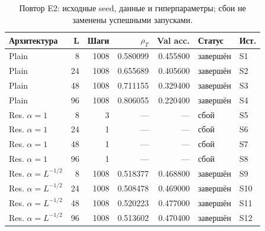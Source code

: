 \begin{table}[H]\centering\footnotesize
\setlength{\tabcolsep}{4pt}
\caption{Повтор E2: исходные seed, данные и гиперпараметры; сбои не заменены успешными запусками.}\label{tab:repeat_e2}
\begin{tabular}{lrrrrll}
\toprule
Архитектура & L & Шаги & $\rho_T$ & Val acc. & Статус & Ист. \\
\midrule
Plain & 8 & 1008 & 0.580099 & 0.455800 & завершён & S1 \\
Plain & 24 & 1008 & 0.655689 & 0.405600 & завершён & S2 \\
Plain & 48 & 1008 & 0.711155 & 0.329400 & завершён & S3 \\
Plain & 96 & 1008 & 0.806055 & 0.220400 & завершён & S4 \\
Res. $\alpha=1$ & 8 & 3 & --- & --- & сбой & S5 \\
Res. $\alpha=1$ & 24 & 1 & --- & --- & сбой & S6 \\
Res. $\alpha=1$ & 48 & 1 & --- & --- & сбой & S7 \\
Res. $\alpha=1$ & 96 & 1 & --- & --- & сбой & S8 \\
Res. $\alpha=L^{-1/2}$ & 8 & 1008 & 0.518377 & 0.468800 & завершён & S9 \\
Res. $\alpha=L^{-1/2}$ & 24 & 1008 & 0.508478 & 0.469000 & завершён & S10 \\
Res. $\alpha=L^{-1/2}$ & 48 & 1008 & 0.520223 & 0.477000 & завершён & S11 \\
Res. $\alpha=L^{-1/2}$ & 96 & 1008 & 0.513602 & 0.470400 & завершён & S12 \\
\bottomrule
\end{tabular}
\end{table}

